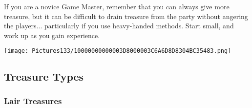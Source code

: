 \documentclass[a4paper,twoside,openany,10pt]{book}
\begin{document}
\begin{multicols}{2}
If you are a novice Game Master, remember that you can always give more treasure, but it can be difficult to drain treasure from the party without angering the players... particularly if you use heavy-handed methods. Start small, and work up as you gain experience. 

\begin{flushleft} \texttt{[image: Pictures133/10000000000003D8000003C6A6D8D8304BC35483.png]}  \end{flushleft}

\end{multicols}

\subsection{Treasure Types}\label{treasure-types}

\subsubsection{Lair Treasures}\label{lair-treasures}
\end{document}
